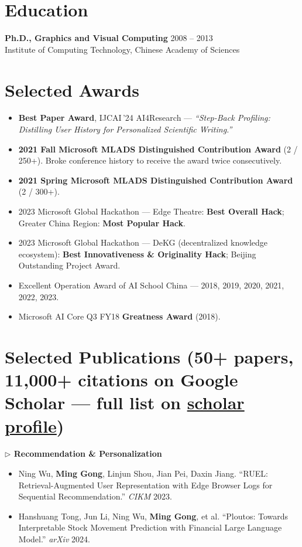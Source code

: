 \documentclass[10.5pt,letterpaper]{article}
\begin{document}
\section*{Education}
\noindent\textbf{Ph.D., Graphics and Visual Computing} \hfill 2008 -- 2013\\
Institute of Computing Technology, Chinese Academy of Sciences

\section*{Selected Awards}
\begin{itemize}
  \item \textbf{Best Paper Award}, IJCAI\,'24 AI4Research --- \textit{``Step-Back Profiling: Distilling User History for Personalized Scientific Writing.''}
  \item \textbf{2021 Fall Microsoft MLADS Distinguished Contribution Award} (2 / 250+). Broke conference history to receive the award twice consecutively.
  \item \textbf{2021 Spring Microsoft MLADS Distinguished Contribution Award} (2 / 300+).
  \item 2023 Microsoft Global Hackathon --- Edge Theatre: \textbf{Best Overall Hack}; Greater China Region: \textbf{Most Popular Hack}.
  \item 2023 Microsoft Global Hackathon --- DeKG (decentralized knowledge ecosystem): \textbf{Best Innovativeness \& Originality Hack}; Beijing Outstanding Project Award.
  \item Excellent Operation Award of AI School China --- 2018, 2019, 2020, 2021, 2022, 2023.
  \item Microsoft AI Core Q3 FY18 \textbf{Greatness Award} (2018).
\end{itemize}

\section*{Selected Publications (50+ papers, 11{,}000+ citations on Google Scholar --- full list on \href{https://scholar.google.com/citations?user=c7JEFwsAAAAJ}{scholar profile})}

\noindent\textcolor{blue!60!black}{\textbf{$\triangleright$ Recommendation \& Personalization}}
\begin{itemize}
  \item Ning Wu, \textbf{Ming Gong}, Linjun Shou, Jian Pei, Daxin Jiang. ``RUEL: Retrieval-Augmented User Representation with Edge Browser Logs for Sequential Recommendation.'' \textit{CIKM} 2023.
  \item Hanshuang Tong, Jun Li, Ning Wu, \textbf{Ming Gong}, et al. ``Ploutos: Towards Interpretable Stock Movement Prediction with Financial Large Language Model.'' \textit{arXiv} 2024.
\end{itemize}
\end{document}
